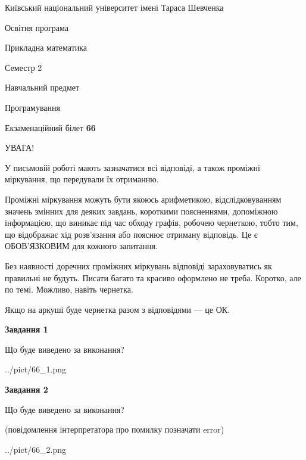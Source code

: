 \documentclass[12pt, ukrainian]{article}
\begin{document}
{{\begin {small}\par
{ \center  Київський національний університет імені Тараса Шевченка \par}
{\parbox {5 cm}{Освітня програма \hfill}{\parbox {7 cm}{Прикладна математика\hfill}}\parbox {6 cm}{\hfill Семестр 2}}\par
{\parbox {5 cm} {Навчальний предмет \hfill}\parbox {7 cm}{Програмування \hfill}\parbox {6cm}{\hfill}\par}\vspace{-7pt} \end{small}}{\center Екзаменаційний білет \No \textbf
{ 66 }\par}}
{
\begin {large}
УВАГА!

У письмовій роботі мають зазначатися всі відповіді, а також проміжні міркування, що передували їх отриманню.

Проміжні міркування можуть бути якоюсь арифметикою, відслідковуванням зна\-чень змінних для деяких завдань,
короткими поясненнями, допоміжною інформацією, що виникає під час обходу графів, робочею чернеткою,
тобто тим, що відображає хід розв’язання або пояснює отриману відповідь.
Це є ОБОВ’ЯЗКОВИМ для кожного запитання.

Без наявності доречних проміжних міркувань відповіді зараховуватись як правиль\-ні не будуть.
Писати багато та красиво оформлено не треба. Коротко, але по темі. Можли\-во, навіть чернетка.

Якщо на аркуші буде чернетка разом з відповідями --- це ОК.

\newpage

{\begin {center}\textbf{Завдання 1}\end {center}}\par
Що буде виведено за виконання?\par
\begin{center}
	{../pict/66_1.png}
\end{center}
\newpage

{\begin {center}\textbf{Завдання 2}\end {center}}\par
Що буде виведено за виконання?\par
 (повідомлення інтерпретатора про помилку позначати error)\par
\begin{center}
	{../pict/66_2.png}
\end{center}
\newpage


\end{large}}
\end{document}
